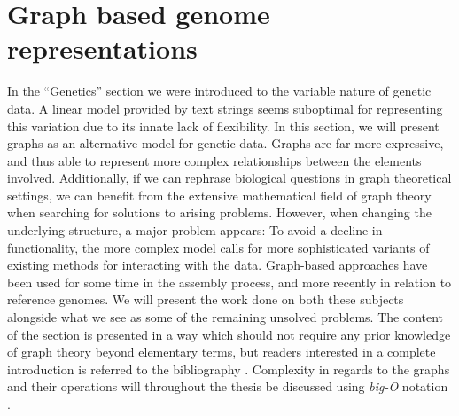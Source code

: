\documentclass[thesis.tex]{subfiles}
\begin{document}
\section{Graph based genome representations}
In the ``Genetics'' section we were introduced to the variable nature of genetic data. A linear model provided by text strings seems suboptimal for representing this variation due to its innate lack of flexibility. In this section, we will present graphs as an alternative model for genetic data. Graphs are far more expressive, and thus able to represent more complex relationships between the elements involved. Additionally, if we can rephrase biological questions in graph theoretical settings, we can benefit from the extensive mathematical field of graph theory when searching for solutions to arising problems. However, when changing the underlying structure, a major problem appears: To avoid a decline in functionality, the more complex model calls for more sophisticated variants of existing methods for interacting with the data. Graph-based approaches have been used for some time in the assembly process, and more recently in relation to reference genomes. We will present the work done on both these subjects alongside what we see as some of the remaining unsolved problems. The content of the section is presented in a way which should not require any prior knowledge of graph theory beyond elementary terms, but readers interested in a complete introduction is referred to the bibliography \cite[Chapter 9]{data_structures_and_algorithm_analysis_in_java}\cite[Chapter 11]{algorithms_sequential_parallell_and_distributed} \cite[Chapter 0]{introduction_to_the_theory_of_computation}. Complexity in regards to the graphs and their operations will throughout the thesis be discussed using \textit{big-O} notation \cite[Chapter 2]{data_structures_and_algorithm_analysis_in_java}\cite[Section 3.1]{algorithms_sequential_parallell_and_distributed}.
\end{document}
